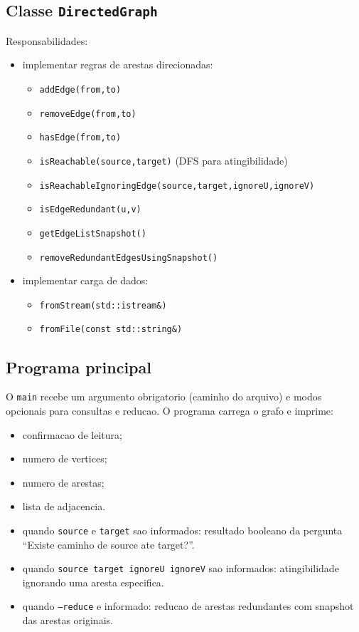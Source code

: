 \documentclass[12pt,a4paper]{article}
\begin{document}
\subsection{Classe \texttt{DirectedGraph}}
Responsabilidades:
\begin{itemize}
    \item implementar regras de arestas direcionadas:
    \begin{itemize}
        \item \texttt{addEdge(from,to)}
        \item \texttt{removeEdge(from,to)}
        \item \texttt{hasEdge(from,to)}
        \item \texttt{isReachable(source,target)} (DFS para atingibilidade)
        \item \texttt{isReachableIgnoringEdge(source,target,ignoreU,ignoreV)}
        \item \texttt{isEdgeRedundant(u,v)}
        \item \texttt{getEdgeListSnapshot()}
        \item \texttt{removeRedundantEdgesUsingSnapshot()}
    \end{itemize}
    \item implementar carga de dados:
    \begin{itemize}
        \item \texttt{fromStream(std::istream\&)}
        \item \texttt{fromFile(const std::string\&)}
    \end{itemize}
\end{itemize}

\subsection{Programa principal}
O \texttt{main} recebe um argumento obrigatorio (caminho do arquivo) e modos opcionais para consultas e reducao. O programa carrega o grafo e imprime:
\begin{itemize}
    \item confirmacao de leitura;
    \item numero de vertices;
    \item numero de arestas;
    \item lista de adjacencia.
    \item quando \texttt{source} e \texttt{target} sao informados: resultado booleano da pergunta ``Existe caminho de source ate target?''.
    \item quando \texttt{source target ignoreU ignoreV} sao informados: atingibilidade ignorando uma aresta especifica.
    \item quando \texttt{--reduce} e informado: reducao de arestas redundantes com snapshot das arestas originais.
\end{itemize}
\end{document}
